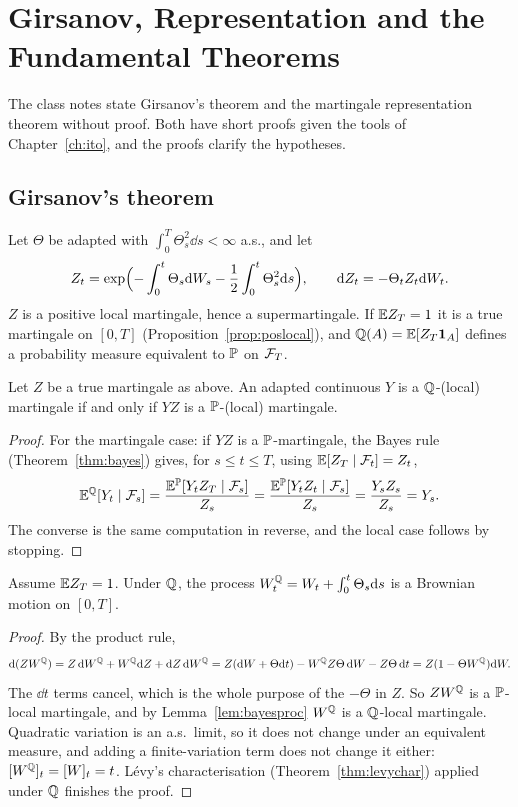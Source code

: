 \chapter{Girsanov, Representation and the Fundamental Theorems}\label{ch:girsanov}

The class notes state Girsanov's theorem and the martingale representation theorem without proof. Both have short proofs given the tools of Chapter~\ref{ch:ito}, and the proofs clarify the hypotheses.

\section{Girsanov's theorem}

Let $\Theta$ be adapted with $\int_0^T\Theta_s^2\dd s<\infty$ a.s., and let
\[
Z_t=\exp\Bigl(-\int_0^t\Theta_s\mathrm{d} W_s-\frac12\int_0^t\Theta_s^2\mathrm{d} s\Bigr),\qquad\mathrm{d} Z_t=-\Theta_tZ_t\mathrm{d} W_t.
\]
$Z$ is a positive local martingale, hence a supermartingale. If $\mathbb{E} Z_T=1$ it is a true martingale on $[0,T]$ (Proposition~\ref{prop:poslocal}), and $\mathbb{Q}(A)=\mathbb{E}[Z_T\mathbf{1}_A]$ defines a probability measure equivalent to $\mathbb{P}$ on $\mathcal{F}_T$.

\begin{lemma}\label{lem:bayesproc}
Let $Z$ be a true martingale as above. An adapted continuous $Y$ is a $\mathbb{Q}$-(local) martingale if and only if $YZ$ is a $\mathbb{P}$-(local) martingale.
\end{lemma}
\begin{proof}
For the martingale case: if $YZ$ is a $\mathbb{P}$-martingale, the Bayes rule (Theorem~\ref{thm:bayes}) gives, for $s\le t\le T$, using $\mathbb{E}[Z_T\mid\mathcal{F}_t]=Z_t$,
\[
\mathbb{E}^{\mathbb{Q}}[Y_t\mid\mathcal{F}_s]=\frac{\mathbb{E}^{\mathbb{P}}[Y_tZ_T\mid\mathcal{F}_s]}{Z_s}=\frac{\mathbb{E}^{\mathbb{P}}[Y_tZ_t\mid\mathcal{F}_s]}{Z_s}=\frac{Y_sZ_s}{Z_s}=Y_s.
\]
The converse is the same computation in reverse, and the local case follows by stopping.
\end{proof}

\begin{theorem}[Girsanov]\label{thm:girsanov}
Assume $\mathbb{E} Z_T=1$. Under $\mathbb{Q}$, the process $W^{\mathbb{Q}}_t=W_t+\int_0^t\Theta_s\mathrm{d} s$ is a Brownian motion on $[0,T]$.
\end{theorem}
\begin{proof}
By the product rule,
\[
\mathrm{d}(ZW^{\mathbb{Q}})=Z\,\mathrm{d} W^{\mathbb{Q}}+W^{\mathbb{Q}}\mathrm{d} Z+\mathrm{d} Z\,\mathrm{d} W^{\mathbb{Q}}=Z(\mathrm{d} W+\Theta\mathrm{d} t)-W^{\mathbb{Q}} Z\Theta\,\mathrm{d} W-Z\Theta\,\mathrm{d} t=Z(1-\Theta W^{\mathbb{Q}})\mathrm{d} W.
\]
The $\dd t$ terms cancel, which is the whole purpose of the $-\Theta$ in $Z$. So $ZW^{\mathbb{Q}}$ is a $\mathbb{P}$-local martingale, and by Lemma~\ref{lem:bayesproc} $W^{\mathbb{Q}}$ is a $\mathbb{Q}$-local martingale. Quadratic variation is an a.s.\ limit, so it does not change under an equivalent measure, and adding a finite-variation term does not change it either: $[W^{\mathbb{Q}}]_t=[W]_t=t$. L\'evy's characterisation (Theorem~\ref{thm:levychar}) applied under $\mathbb{Q}$ finishes the proof.
\end{proof}

